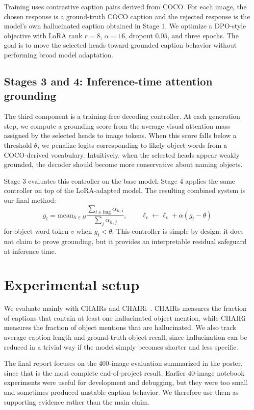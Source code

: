 \documentclass[10pt,twocolumn]{article}
\begin{document}
Training uses contrastive caption pairs derived from COCO. For each image, the chosen response is a ground-truth COCO caption and the rejected response is the model's own hallucinated caption obtained in Stage 1. We optimize a DPO-style objective with LoRA rank $r=8$, $\alpha=16$, dropout $0.05$, and three epochs. The goal is to move the selected heads toward grounded caption behavior without performing broad model adaptation.

\subsection{Stages 3 and 4: Inference-time attention grounding}
The third component is a training-free decoding controller. At each generation step, we compute a grounding score from the average visual attention mass assigned by the selected heads to image tokens. When this score falls below a threshold $\theta$, we penalize logits corresponding to likely object words from a COCO-derived vocabulary. Intuitively, when the selected heads appear weakly grounded, the decoder should become more conservative about naming objects.

Stage 3 evaluates this controller on the base model. Stage 4 applies the same controller on top of the LoRA-adapted model. The resulting combined system is our final method:
\[
g_t = \mathrm{mean}_{h \in H} \frac{\sum_{i \in \mathrm{img}} \alpha_{h,i}}{\sum_j \alpha_{h,j}},
\qquad
\ell_v \leftarrow \ell_v + \alpha (g_t - \theta)
\]
for object-word token $v$ when $g_t < \theta$. This controller is simple by design: it does not claim to prove grounding, but it provides an interpretable residual safeguard at inference time.

\section{Experimental setup}
We evaluate mainly with CHAIRs and CHAIRi~\cite{rohrbach2018object}. CHAIRs measures the fraction of captions that contain at least one hallucinated object mention, while CHAIRi measures the fraction of object mentions that are hallucinated. We also track average caption length and ground-truth object recall, since hallucination can be reduced in a trivial way if the model simply becomes shorter and less specific.

The final report focuses on the 400-image evaluation summarized in the poster, since that is the most complete end-of-project result. Earlier 40-image notebook experiments were useful for development and debugging, but they were too small and sometimes produced unstable caption behavior. We therefore use them as supporting evidence rather than the main claim.
\end{document}
